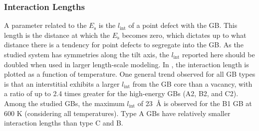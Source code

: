 \documentclass[review]{elsarticle}
\providecommand{\DIFdeltex}[1]{} %
\providecommand{\DIFdelend}{\protect\color{black}} %
\providecommand{\DIFdelFL}[1]{\DIFdel{#1}} %
\providecommand{\DIFdel}[1]{\texorpdfstring{\DIFdeltex{#1}}{}} %
\DeclareRobustCommand{\DIFdelend}{\DIFOaddend \let\includegraphics\DIFOincludegraphics} %
\begin{document}
{%
\DIFdelFL{Segregation energy of point defects at GBs in $\alpha$-U at different studied temperatures plotted as a function of the corresponding $E_{\mathrm{gb}}$.}}

\DIFdelend \FloatBarrier

\subsubsection{Interaction Lengths}
\par A parameter related to the $E_{\mathrm{s}}$ is the  $l_{\mathrm{int}}$ of a point defect with the GB. This length is the distance at which the $E_{\mathrm{s}}$ becomes zero, which dictates up to what distance there is a tendency for point defects to segregate into the GB. As the studied system has symmetries along the tilt axis, the $l_{\mathrm{int}}$ reported here should be doubled when used in larger length-scale modeling. In , the interaction length is plotted as a function of temperature. One general trend observed for all GB types is that an interstitial exhibits a larger  $l_{\mathrm{int}}$ from the GB core than a vacancy, with a ratio of up to 2.4 times greater for the high-energy GBs (A2, B2, and C2). Among the studied GBs, the maximum  $l_{\mathrm{int}}$ of 23~{\AA} is observed for the B1 GB at 600 K (considering all temperatures). Type A GBs have relatively smaller interaction lengths than type C and B. 
\end{document}
